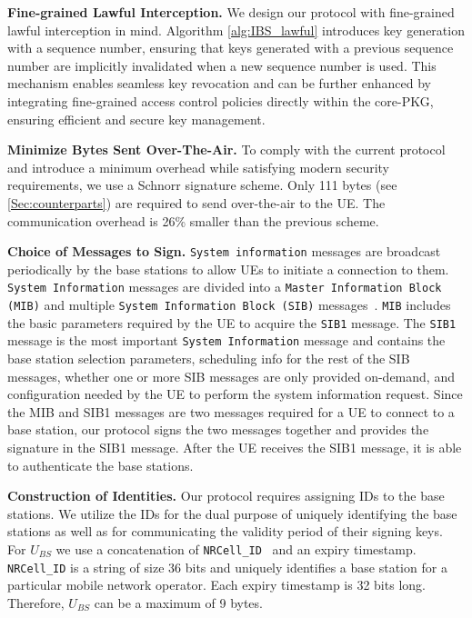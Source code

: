 \noindent \textbf{Fine-grained Lawful Interception. } 
We design our protocol with fine-grained lawful interception in mind. Algorithm \ref{alg:IBS_lawful} introduces key generation with a sequence number, ensuring that keys generated with a previous sequence number are implicitly invalidated when a new sequence number is used. This mechanism enables seamless key revocation and can be further enhanced by integrating fine-grained access control policies directly within the core-PKG, ensuring efficient and secure key management. 

\noindent \textbf{Minimize Bytes Sent Over-The-Air.} 
To comply with the current protocol and introduce a minimum overhead while satisfying modern security requirements, we use a Schnorr signature scheme. 
Only 111 bytes (see \ref{Sec:counterparts}) are required to send over-the-air to the UE. The communication overhead is 26\% smaller than the previous scheme.  

\noindent \textbf{Choice of Messages to Sign.} \texttt{System information} messages are broadcast periodically by the base stations to allow UEs to initiate a connection to them. \texttt{System Information} messages are divided into a \texttt{Master Information Block (MIB)} and multiple \texttt{System Information Block (SIB)} messages~\cite{3GPP:38.331}. \texttt{MIB} includes the basic parameters required by the UE to acquire the \texttt{SIB1} message. The \texttt{SIB1} message is the most important \texttt{System Information} message and contains the base station selection parameters, scheduling info for the rest of the SIB messages, whether one or more SIB messages are only provided on-demand, and configuration needed by the UE to perform the system information request.  
Since the MIB and SIB1 messages are two messages required for a UE to connect to a base station, our protocol signs the two messages together and provides the signature in the SIB1 message. After the UE receives the SIB1 message, it is able to authenticate the base stations. 

\noindent \textbf{Construction of Identities.} Our protocol requires assigning IDs to the base stations. We utilize the IDs for the dual purpose of uniquely identifying the base stations as well as for communicating the validity period of their signing keys. 
For $U_{BS}$ we use a concatenation of \texttt{NRCell\_ID}~\cite{3GPP:29.571} and an expiry timestamp. \texttt{NRCell\_ID} is a string of size 36 bits and uniquely identifies a base station for a particular mobile network operator. Each expiry timestamp is 32 bits long. Therefore, $U_{BS}$ can be a maximum of 9 bytes. 

